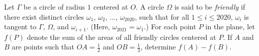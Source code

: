 Let $\Gamma$ be a circle of radius $1$ centered at $O$. A circle $\Omega$ is said to be \emph{friendly} if there exist distinct circles $\omega_1$,  $\omega_2$,  $\ldots$,  $\omega_{2020}$,  such that for all $1\le i\le2020$,  $\omega_i$ is tangent to $\Gamma$,  $\Omega$,  and $\omega_{i+1}$. (Here, $\omega_{2021} = \omega_1$.) For each point $P$ in the plane, let $f(P)$ denote the sum of the areas of all friendly circles centered at $P$. If $A$ and $B$ are points such that $OA=\frac12$ and $OB=\frac13$,  determine $f(A)-f(B)$.